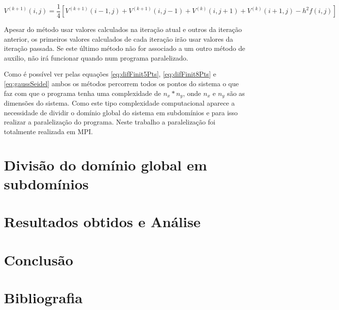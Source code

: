 \documentclass[10pt]{extarticle}
\begin{document}
  \begin{equation}  \label{eq:gaussSeidel}
   V^{(k+1)}(i,j)=\frac{1}{4}[V^{(k+1)}(i-1,j)+V^{(k+1)}(i,j-1)+V^{(k)}(i,j+1)     	                +V^{(k)}(i+1,j)-h^2f(i,j)]
  \end{equation}
		
Apesar do método usar valores calculados na iteração atual e outros da iteração anterior, os primeiros valores calculados de cada iteração irão usar valores da iteração passada. Se este último método não for associado a um outro método de auxilio, não irá funcionar quando num programa paralelizado.

Como é possível ver pelas equações \ref{eq:difFinit5Pts}, \ref{eq:difFinit8Pts} e \ref{eq:gaussSeidel} ambos os métodos percorrem todos os pontos do sistema o que faz com que o programa tenha uma complexidade de $n_x*n_y$, onde $n_x$ e $n_y$ são as dimensões do sistema. Como este tipo complexidade computacional aparece a necessidade de dividir o domínio global do sistema em subdomínios e para isso realizar a paralelização do programa. Neste trabalho a paralelização foi totalmente realizada em MPI. 
		
\section{Divisão do domínio global em subdomínios} \label{sec:global2Local}












\section{Resultados obtidos e Análise}



\section{Conclusão}



\section{Bibliografia}
\end{document}
